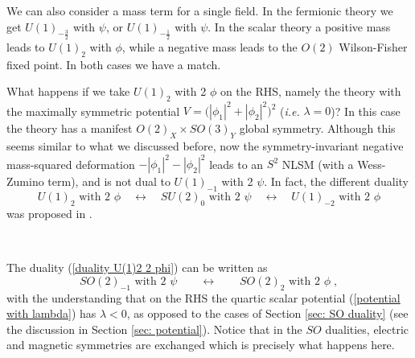 \documentclass[a4paper, 12pt]{article}
\newcommand{\ie}{\textit{i.e.}}
\numberwithin{equation}{section}
\newcommand{\be}{\begin{equation}} \newcommand{\ee}{\end{equation}}
\begin{document}
We can also consider a mass term for a single field. In the fermionic theory we get $U(1)_{-\frac32}$ with $\psi$, or $U(1)_{-\frac12}$ with $\psi$. In the scalar theory a positive mass leads to $U(1)_2$ with $\phi$, while a negative mass leads to the $O(2)$ Wilson-Fisher fixed point. In both cases we have a match.

What happens if we take $U(1)_2$ with 2 $\phi$ on the RHS, namely the theory with the maximally symmetric potential $V = \big( |\phi_1|^2 + |\phi_2|^2 \big)^2$ (\ie{} $\lambda=0$)? In this case the theory has a manifest $O(2)_X \times SO(3)_Y$ global symmetry. Although this seems similar to what we discussed before, now the symmetry-invariant negative mass-squared deformation $- |\phi_1|^2 - |\phi_2|^2$ leads to an $S^2$ NLSM (with a Wess-Zumino term), and is not dual to $U(1)_{-1}$ with 2 $\psi$. In fact, the different duality
\be
U(1)_2 \text{ with 2 $\phi$} \quad\longleftrightarrow\quad SU(2)_0 \text{ with 2 $\psi$} \quad\longleftrightarrow\quad U(1)_{-2} \text{ with 2 $\phi$}
\ee
was proposed in \cite{Komargodski:2017keh}.

\

The duality (\ref{duality U(1)2 2 phi}) can be written as
\be
\label{special SO(2) duality}
SO(2)_{-1} \text{ with 2 $\psi$} \qquad\longleftrightarrow\qquad SO(2)_2 \text{ with 2 $\phi$} \;,
\ee
with the understanding that on the RHS the quartic scalar potential (\ref{potential with lambda}) has $\lambda<0$, as opposed to the cases of Section \ref{sec: SO duality} (see the discussion in Section \ref{sec: potential}). Notice that in the $SO$ dualities, electric and magnetic symmetries are exchanged \cite{Aharony:2013kma, Aharony:2015mjs, Aharony:2016jvv} which is precisely what happens here.
\end{document}
